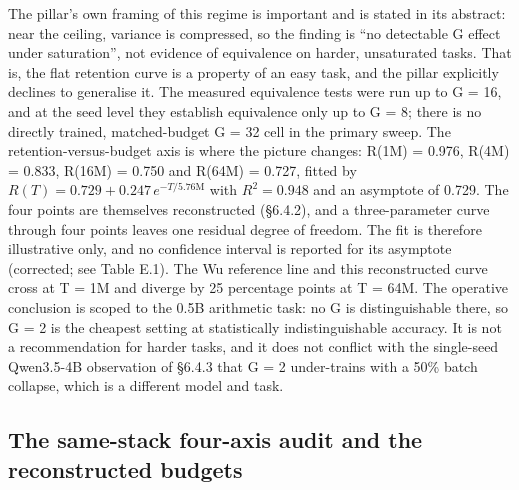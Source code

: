 \documentclass[12pt,a4paper]{report}
\begin{document}
The pillar's own framing of this regime is important and is stated in
its abstract: near the ceiling, variance is compressed, so the finding
is ``no detectable G effect under saturation'', not evidence of
equivalence on harder, unsaturated tasks. That is, the flat retention
curve is a property of an easy task, and the pillar explicitly declines
to generalise it. The measured equivalence tests were run up to G = 16,
and at the seed level they establish equivalence only up to G = 8; there
is no directly trained, matched-budget G = 32 cell in the primary sweep.
The retention-versus-budget axis is where the picture changes: R(1M) =
0.976, R(4M) = 0.833, R(16M) = 0.750 and R(64M) = 0.727, fitted by
\(R(T) = 0.729 + 0.247\,e^{-T/5.76\mathrm{M}}\) with \(R^2 = 0.948\) and
an asymptote of 0.729. The four points are themselves reconstructed
(§6.4.2), and a three-parameter curve through four points leaves one
residual degree of freedom. The fit is therefore illustrative only, and
no confidence interval is reported for its asymptote (corrected; see
Table E.1). The Wu reference line and this reconstructed curve cross at
T = 1M and diverge by 25 percentage points at T = 64M. The operative
conclusion is scoped to the 0.5B arithmetic task: no G is
distinguishable there, so G = 2 is the cheapest setting at statistically
indistinguishable accuracy. It is not a recommendation for harder tasks,
and it does not conflict with the single-seed Qwen3.5-4B observation of
§6.4.3 that G = 2 under-trains with a 50\% batch collapse, which is a
different model and task.

\subsection{The same-stack four-axis audit and the reconstructed
budgets}\label{the-same-stack-four-axis-audit-and-the-reconstructed-budgets}
\end{document}
